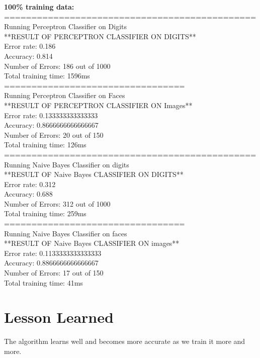 \documentclass{article}
\begin{document}
        
        \textbf{100\% training data: }\\
        ==============================================\\
        Running Perceptron Classifier on Digits\\
        **RESULT OF PERCEPTRON CLASSIFIER ON DIGITS**\\
        Error rate: 0.186 \\
        Accuracy: 0.814\\
        Number of Errors: 186 out of 1000\\
        Total training time: 1596ms\\
        =================================\\
        Running Perceptron Classifier on Faces\\
        **RESULT OF PERCEPTRON CLASSIFIER ON Images**\\
        Error rate: 0.133333333333333 \\
        Accuracy: 0.8666666666666667\\
        Number of Errors: 20 out of 150\\
        Total training time: 126ms\\
        
        ==============================================\\
        Running Naive Bayes Classifier on digits\\
        **RESULT OF Naive Bayes CLASSIFIER ON DIGITS**\\
        Error rate: 0.312 \\
        Accuracy: 0.688\\
        Number of Errors: 312 out of 1000\\
        Total training time: 259ms\\
        =================================\\
        Running Naive Bayes Classifier on faces\\
        **RESULT OF Naive Bayes CLASSIFIER ON images**\\
        Error rate: 0.1133333333333333 \\
        Accuracy: 0.8866666666666667\\
        Number of Errors: 17 out of 150\\
        Total training time: 41ms\\
        

        
   


\section{Lesson Learned}
    \qquad The algorithm learns well and becomes more accurate as we train it more and more.
         
\end{document}
